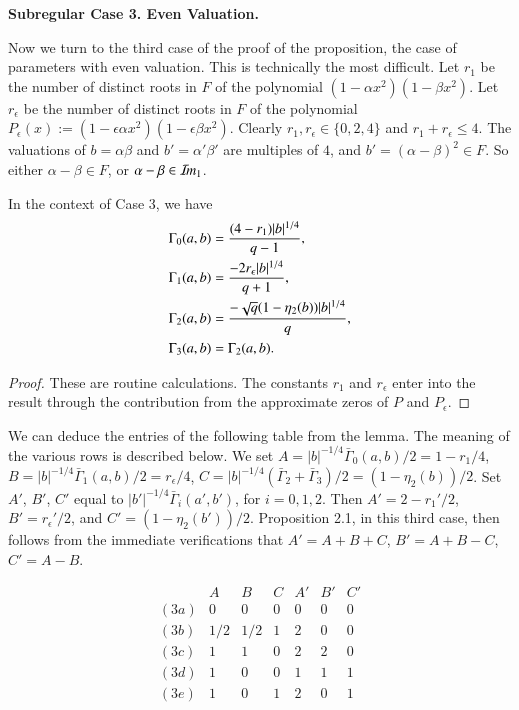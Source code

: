 \documentclass{amsart}
\newcommand\Imm{{\mathcal I\hskip-.2em m}}
\newcommand\bGamma{\bar\Gamma}
\newenvironment{cthm}[1]
  {\renewcommand\thethm{\bf #1}\thm}
  {\endthm}
\begin{document}
\bigskip
\centerline{\bf Subregular Case 3. Even Valuation.}
\bigskip

Now we turn to the third case of the proof of the proposition, the
case of parameters with even valuation.
This is technically the most difficult.
Let $r_1$ be the number of distinct roots in $F$
of the polynomial $(1-\alpha x^2)(1-\beta x^2)$.  Let $r_\epsilon$
be the number of distinct roots in $F$ of the polynomial
$P_\epsilon(x):=(1-\epsilon \alpha x^2)(1-\epsilon\beta x^2)$.  Clearly
$r_1,r_\epsilon\in \{0,2,4\}$ and $r_1+r_\epsilon\le 4$.
The valuations of $b=\alpha\beta$ and $b'=\alpha'\beta'$ are multiples of $4$, 
and
$b'=(\alpha-\beta)^2 \in F$.  So either
$\alpha-\beta\in F$, or $\alpha-\beta\in \Imm_1$.

\smallskip
\noindent
\begin{cthm}{Lemma 2.7}  In the context of Case 3, we have
\begin{align*}
\Gamma_0(a,b) &= {(4-r_1)|b|^{1/4}\over q-1},\\
\Gamma_1(a,b) &= {-2r_\epsilon|b|^{1/4}\over q+1}, \\
\Gamma_2(a,b) &= {-\sqrt{q}(1-\eta_2(b))|b|^{1/4}\over q}, \\
\Gamma_3(a,b) &= \Gamma_2(a,b).
\end{align*}
\end{cthm}

\smallskip
\noindent
\begin{proof} 
These are routine calculations.  The constants
$r_1$ and $r_\epsilon$ enter into the result through the contribution
from the approximate zeros of $P$ and $P_\epsilon$.\end{proof}

We can deduce the entries of the following table from the lemma.
The meaning of the various rows is described below.
We set $A = |b|^{-1/4}\bGamma_0(a,b)/2= 1 - r_1/4$, 
$B=|b|^{-1/4}\bGamma_1(a,b)/2= r_\epsilon/4$, 
$C=|b|^{-1/4}(\bGamma_2+\bGamma_3)/2= (1-\eta_2(b))/2$.
Set $A'$, $B'$, $C'$ 
equal to $|b'|^{-1/4}\bGamma_i(a',b')$, for $i=0,1,2$.
Then $A' = 2-r_1'/2$, $B'= r_\epsilon'/2$, and $C' = (1-\eta_2(b'))/2$.
Proposition 2.1, in this third case, then follows from the immediate
verifications that $A'=A+B+C$, $B'=A+B-C$, $C'=A-B$.

$$\begin{matrix}
&A&B&C&A'&B'&C'\\
(3a)&0&0&0&0&0&0 \\
(3b)&1/2&1/2&1&2&0&0 \\
(3c)&1&1&0&2&2&0 \\
(3d)&1&0&0&1&1&1 \\
(3e)&1&0&1&2&0&1
\end{matrix}
$$
\end{document}
